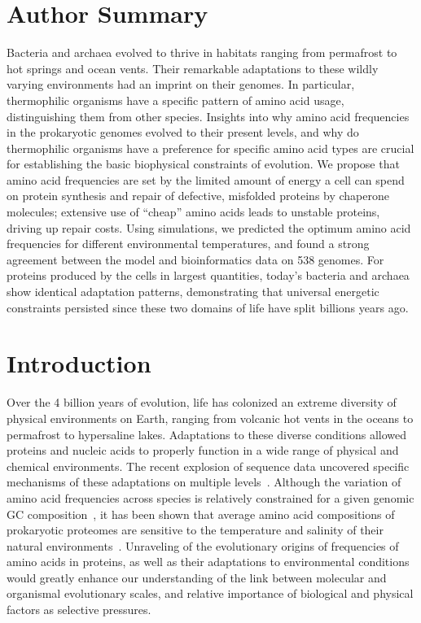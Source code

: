 \documentclass[10pt,letterpaper]{article}
\begin{document}
\section*{Author Summary}

Bacteria and archaea evolved to thrive in habitats ranging from permafrost to hot springs and ocean vents. Their remarkable adaptations to these wildly varying environments had an imprint on their genomes. In particular, thermophilic organisms have a specific pattern of amino acid usage, distinguishing them from other species. Insights into why amino acid frequencies in the prokaryotic genomes evolved to their present levels, and why do thermophilic organisms have a preference for specific amino acid types are crucial for establishing the basic biophysical constraints of evolution. We propose that amino acid frequencies are set by the limited amount of energy a cell can spend on protein synthesis and repair of defective, misfolded proteins by chaperone molecules; extensive use of “cheap” amino acids leads to unstable proteins, driving up repair costs. Using simulations, we predicted the optimum amino acid frequencies for different environmental temperatures, and found a strong agreement between the model and bioinformatics data on 538 genomes. For proteins produced by the cells in largest quantities, today’s bacteria and archaea show identical adaptation patterns, demonstrating that universal energetic constraints persisted since these two domains of life have split billions years ago.


\section*{Introduction}

Over the 4 billion years of evolution, life has colonized an extreme diversity of physical environments on Earth, ranging from volcanic hot vents in the oceans to permafrost to hypersaline lakes. Adaptations to these diverse conditions allowed proteins and nucleic acids to properly function in a wide range of physical and chemical environments. The recent explosion
of sequence data uncovered specific mechanisms of these adaptations on multiple levels~\cite{Berezovsky2007Positive,Galtier1997Relationships,Zeldovich2007Protein,England2003Natural,Sghaier2013There,Fukuchi2003Unique,Sabath2013Growth}. Although the variation of amino acid frequencies across species is relatively constrained for a given genomic GC composition~\cite{Krick2014Amino,Goncearenco2014Fundamental}, it has been shown that average amino acid compositions of prokaryotic proteomes are sensitive to the temperature and salinity of their natural environments~\cite{Fukuchi2003Unique,Kreil2001Identification}. Unraveling of the evolutionary origins of frequencies of amino acids in proteins, as well as their adaptations to environmental conditions would greatly enhance our understanding of the link between molecular and organismal evolutionary scales, and relative importance of biological and physical factors as selective pressures.
\end{document}
